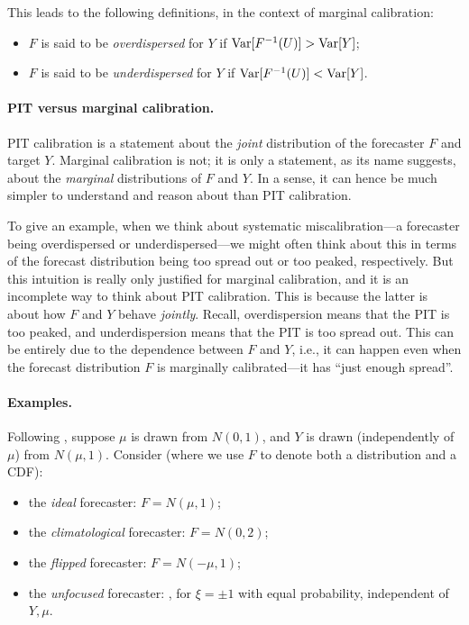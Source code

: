 \documentclass{article}
\begin{document}
This leads to the following definitions, in the context of marginal calibration:      

\begin{itemize}
\item $F$ is said to be \emph{overdispersed} for $Y$ if $\mathrm{Var}[F^{-1}(U)] > \mathrm{Var}[Y]$;
\item $F$ is said to be \emph{underdispersed} for $Y$ if $\mathrm{Var}[F^{-1}(U)] < \mathrm{Var}[Y]$.
\end{itemize}

\paragraph{PIT versus marginal calibration.}

PIT calibration is a statement about the \emph{joint} distribution of the
forecaster $F$ and target $Y$. Marginal calibration is not; it is only a
statement, as its name suggests, about the \emph{marginal} distributions of $F$
and $Y$. In a sense, it can hence be much simpler to understand and reason about 
than PIT calibration.

To give an example, when we think about systematic miscalibration---a forecaster 
being overdispersed or underdispersed---we might often think about this in terms 
of the forecast distribution being too spread out or too peaked, respectively.
But this intuition is really only justified for marginal calibration, and it is an
incomplete way to think about PIT calibration. This is because the latter is
about how $F$ and $Y$ behave \emph{jointly}. Recall, overdispersion means that
the PIT is too peaked, and underdispersion means that the PIT is too spread
out. This can be entirely due to the dependence between $F$ and $Y$, i.e., it
can happen even when the forecast distribution $F$ is marginally calibrated---it
has ``just enough spread''.

\paragraph{Examples.}

Following \citet{gneiting2007probabilistic}, suppose $\mu$ is drawn from $N(0, 
1)$, and $Y$ is drawn (independently of $\mu$) from $N(\mu, 1)$. Consider (where
we use $F$ to denote both a distribution and a CDF):

\begin{itemize}
\item the \emph{ideal} forecaster: $F = N(\mu, 1)$;
\item the \emph{climatological} forecaster: $F = N(0, 2)$;
\item the \emph{flipped} forecaster: $F = N(-\mu, 1)$;  
\item the \emph{unfocused} forecaster: , for $\xi = \pm 1$ with equal probability, independent 
  of $Y,\mu$.
\end{itemize}
\end{document}
